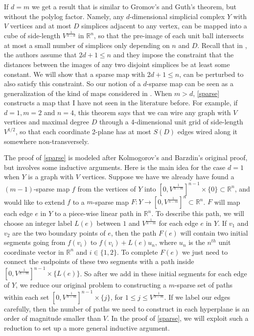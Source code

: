 \documentclass[12pt]{article}
\newcommand{\RR}{\mathbb{R}}
\begin{document}
	If $d = m$ we get a result that is similar to Gromov's and Guth's theorem, but without the polylog factor. Namely, any $d$-dimensional simplicial complex $Y$ with $V$ vertices and at most $D$ simplices adjacent to any vertex, can be mapped into a cube of side-length $V^{\frac{1}{n-d}}$ in $\mathbb{R}^n$, so that the pre-image of each unit ball intersects at most a small number of simplices only depending on $n$ and $D$. Recall that in \cite{GG}, the authors assume that $2d+1 \le n$ and they impose the constraint that the distances between the images of any two disjoint simplices be at least some constant. We will show that a sparse map with $2d+1 \le n$, can be perturbed to also satisfy this constraint. So our notion of a $d$-sparse map can be seen as a generalization of the kind of maps considered in \cite{GG}. When $m > d$, \cref{sparse} constructs a map that I have not seen in the literature before. For example, if $d=1, m=2$ and $n=4$, this theorem says that we can wire any graph with $V$ vertices and maximal degree $D$ through a 4-dimensional unit grid of side-length $V^{1/2}$, so that each coordinate 2-plane has at most $S(D)$ edges wired along it somewhere non-transversely.
	
	The proof of \cref{sparse} is modeled after Kolmogorov's and Barzdin's original proof, but involves some inductive arguments. Here is the main idea for the case $d=1$ when $Y$ is a graph with $V$ vertices. Suppose we have we already have found a $(m-1)$-sparse map $f$ from the vertices of $Y$ into $[0, V^{\frac{1}{n-m}}]^{n-1} \times \{0\} \subset \RR^n$, and would like to extend $f$ to a $m$-sparse map $F: Y \to [0, V^{\frac{1}{n-m}}]^{n} \subset \RR^n$. $F$ will map each edge $e$ in $Y$ to a piece-wise linear path in $\RR^n$. To describe this path, we will choose an integer label $L(e)$ between $1$ and $V^{\frac{1}{n-m}}$ for each edge $e$ in $Y$. If $v_1$ and $v_2$ are the two boundary points of $e$, then the path $F(e)$ will contain two initial segments going from $f(v_i)$ to $f(v_i) + L(e)u_n$, where $u_n$ is the $n^{th}$ unit coordinate vector in $\RR^n$ and $i \in \{1,2\}$. To complete $F(e)$ we just need to connect the endpoints of these two segments with a path inside $[0, V^{\frac{1}{n-m}}]^{n-1} \times \{L(e)\}$. So after we add in these initial segments for each edge of $Y$, we reduce our original problem to constructing a $m$-sparse set of paths within each set $[0, V^{\frac{1}{n-m}}]^{n-1} \times \{j\}$, for $1 \le j \le V^{\frac{1}{n-m}}$. If we label our edges carefully, then the number of paths we need to construct in each hyperplane is an order of magnitude smaller than $V$. In the proof of \cref{sparse}, we will exploit such a reduction to set up a more general inductive argument. 
	
\end{document}
